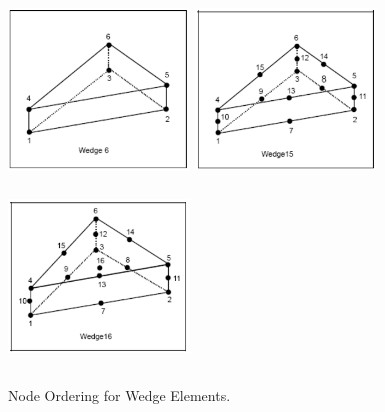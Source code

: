 \begin{figure}
\begin{center}
{\includegraphics[width=1.9in, height=1.9in]{topology/wedge06.png}}
{\includegraphics[width=1.9in, height=1.9in]{topology/wedge15.png}}
{\includegraphics[width=1.9in, height=1.9in]{topology/wedge16.png}}
\caption{Node Ordering for Wedge Elements.}\label{topology:wedge}
\end{center}
\end{figure}

